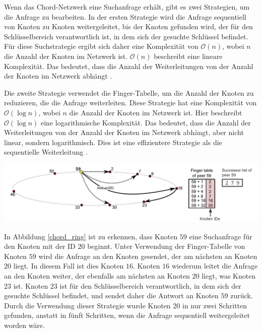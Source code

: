 Wenn das Chord-Netzwerk eine Suchanfrage erhält, gibt es zwei Strategien, um die Anfrage zu bearbeiten. In der ersten Strategie wird die Anfrage sequentiell von Knoten zu Knoten weitergeleitet, bis der Knoten gefunden wird, der für den Schlüsselbereich verantwortlich ist, in dem sich der gesuchte Schlüssel befindet. Für diese Suchstrategie ergibt sich daher eine Komplexität von $\mathcal{O}(n)$, wobei $n$ die Anzahl der Knoten im Netzwerk ist. $\mathcal{O}(n)$ beschreibt eine lineare Komplexität. Das bedeutet, dass die Anzahl der Weiterleitungen von der Anzahl der Knoten im Netzwerk abhängt \parencite[S. 810-811]{MedranoChavez_ChordKademliaHighChurnScenarios}.

Die zweite Strategie verwendet die Finger-Tabelle, um die Anzahl der Knoten zu reduzieren, die die Anfrage weiterleiten. Diese Strategie hat eine Komplexität von $\mathcal{O}(\log n)$, wobei $n$ die Anzahl der Knoten im Netzwerk ist. Hier beschreibt $\mathcal{O}(\log n)$ eine logarithmische Komplexität. Das bedeutet, dass die Anzahl der Weiterleitungen von der Anzahl der Knoten im Netzwerk abhängt, aber nicht linear, sondern logarithmisch. Dies ist eine effizientere Strategie als die sequentielle Weiterleitung \parencite[S. 810-811]{MedranoChavez_ChordKademliaHighChurnScenarios}.

\begin{center}
    \captionsetup{type=figure}
    \includegraphics[width=1\linewidth]{images/chord_ring_altered.png}
    \label{chord_ring}
\end{center}

\noindent In Abbildung \ref{chord_ring} ist zu erkennen, dass Knoten $59$ eine Suchanfrage für den Knoten mit der ID $20$ beginnt. Unter Verwendung der Finger-Tabelle von Knoten $59$ wird die Anfrage an den Knoten gesendet, der am nächsten an Knoten $20$ liegt. In diesem Fall ist dies Knoten $16$. Knoten $16$ wiederum leitet die Anfrage an den Knoten weiter, der ebenfalls am nächsten an Knoten $20$ liegt, was Knoten $23$ ist. Knoten $23$ ist für den Schlüsselbereich verantwortlich, in dem sich der gesuchte Schlüssel befindet, und sendet daher die Antwort an Knoten $59$ zurück. Durch die Verwendung dieser Strategie wurde Knoten $20$ in nur zwei Schritten gefunden, anstatt in fünft Schritten, wenn die Anfrage sequentiell weitergeleitet worden wäre.    

